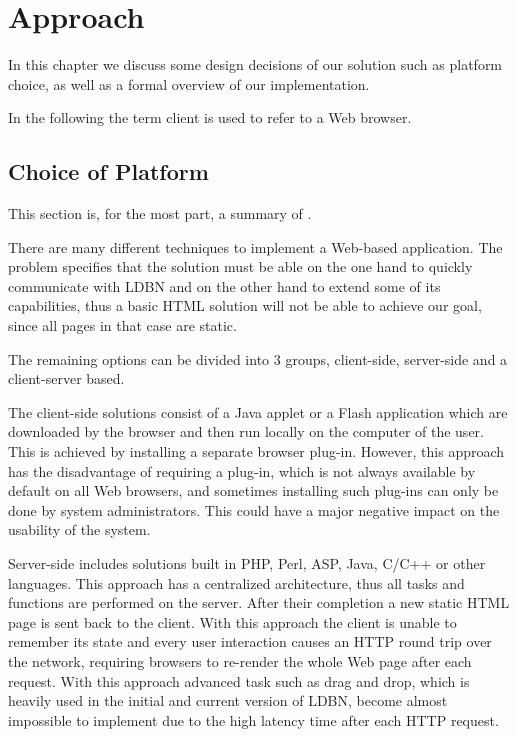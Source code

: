 \chapter{Approach}
\label{chap:approach}
In this chapter we discuss some design decisions of our solution such as 
platform choice, as well as a formal overview of our implementation. 

In the following the term client is used to refer to a Web browser.

\section{Choice of Platform}
\label{sec:platform}
This section is, for the most part, a summary of \cite[Section~3.1 and Section~3.2]{mt1}.

There are many different techniques to implement a Web-based application. 
The problem specifies that the solution must be able on the one hand to 
quickly communicate with LDBN 
and on the other hand to extend some of its capabilities, 
thus a basic HTML solution will not be able to achieve our goal, 
since all pages in that case are static. 

The remaining options can be divided into 3 groups, client-side, server-side and
a client-server based. 

The client-side solutions consist of a Java applet or a Flash
application which are downloaded by the browser and then run locally on the computer of the user.
This is achieved by installing a separate browser plug-in. However, this approach has the disadvantage
of requiring a plug-in, which is not always available by default on all Web browsers, and sometimes
installing such plug-ins can only be done by system administrators. This could have a major negative
impact on the usability of the system. 

Server-side includes solutions built in PHP, Perl, ASP, Java, C/C++ or other languages.
This approach
has a centralized architecture, thus all tasks and functions are performed on the server.
After their completion a new static HTML page is sent back to the client.
With this approach the client is unable to remember its state and 
every user interaction causes an HTTP round trip over the network, 
requiring browsers to re-render the whole Web page after each request. With this approach
advanced task such as drag and drop, which is heavily used in the initial and current
version of LDBN, become almost impossible to implement due to the high latency time after each
HTTP request. 


